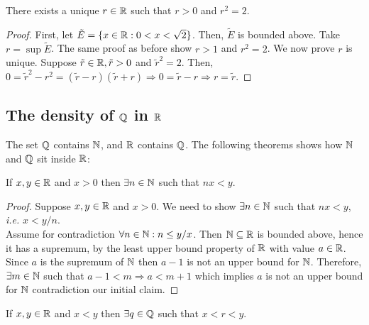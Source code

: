 \begin{theorem}
    There exists a unique $r \in \mathbb{R}$ such that $r>0$ and $r^2 = 2$.
\end{theorem}

\begin{proof}
    First, let $\tilde{E} = \{ x \in \mathbb{R}: 0 < x < \sqrt{2} \}$. Then, $\tilde{E}$ is bounded above. Take $r = \sup \tilde{E}$. The same proof as before show $r > 1$ and $r^2 = 2$. We now prove $r$ is unique. Suppose $\tilde{r} \in \mathbb{R}, \tilde{r}>0$ and $\tilde{r}^2 = 2$. Then, $0 = \tilde{r}^2 - r^2 = (\tilde{r} - r)(\tilde{r} + r) \Rightarrow 0 = \tilde{r} - r \Rightarrow r = \tilde{r}$.
\end{proof}

\subsection{The density of $\Q$ in $\R$}

The set $\Q$ contains $\mathbb{N}$, and $\R$ contains $\Q$. The following theorems shows how $\mathbb{N}$ and $\Q$ sit inside $\R$:

\begin{theorem}
    If $x, y \in \mathbb{R}$ and $x > 0$ then $\exists n \in \mathbb{N}$ such that $nx < y$.
\end{theorem}

\begin{proof}
    Suppose $x, y \in \mathbb{R}$ and $x > 0$. We need to show $\exists n \in \mathbb{N}$ such that $nx < y$, \emph{i.e.} $x < y/n$. \\
    Assume for contradiction $\forall n \in \mathbb{N}: n \leq y/x$. Then $\mathbb{N} \subseteq \mathbb{R}$ is bounded above, hence it has a supremum, by the least upper bound property of $\R$ with value $a \in \mathbb{R}$. Since $a$ is the supremum of $\mathbb{N}$ then $a-1$ is not an upper bound for $\mathbb{N}$. Therefore, $\exists m \in \mathbb{N}$ such that $a-1 < m \Rightarrow a < m + 1$ which implies $a$ is not an upper bound for $\mathbb{N}$ contradiction our initial claim.
\end{proof}

\begin{theorem}[Densit of $\Q$ in $\R$]
    If $x, y \in \mathbb{R}$ and $x < y$ then $\exists q \in \mathbb{Q}$ such that $x < r < y$.
\end{theorem}


